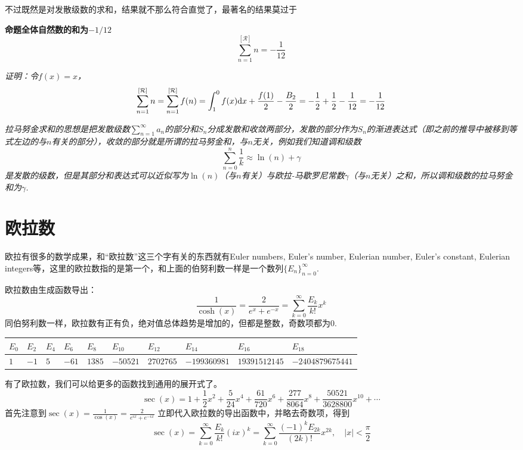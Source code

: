 \documentclass[UTF8]{ctexart}
\newcommand{\trm}[1]{{\rm #1}}
\newenvironment{proposition}[1]
    {\begin{tcolorbox}[enhanced, colback=LightYellow, breakable=true, frame hidden, borderline west={1.5mm}{-2mm}{Purple}]
    {\bfseries {\color{Purple} 命题}\quad #1} \newline}
    {\end{tcolorbox}}
\begin{document}
不过既然是对发散级数的求和，结果就不那么符合直觉了，最著名的结果莫过于
\begin{proposition}{全体自然数的和为\(-1/12\)}
    \[\sum_{n=1}^{[\mathcal{R}]}n=-\frac{1}{12}\]
\end{proposition}
\textit{证明：令\(f(x)=x\)，}
\[\sum_{n=1}^{[\mathcal{R}]}n = \sum_{n=1}^{[\mathcal{R}]}f(n) = \int_{1}^{0}f(x)\trm{d}x+\frac{f(1)}{2}-\frac{B_2}{2} = -\frac{1}{2}+\frac{1}{2}-\frac{1}{12} = -\frac{1}{12}\]

\textit{
    拉马努金求和的思想是把发散级数\(\displaystyle{\sum_{n=1}^{\infty}a_n}\)的部分和\(S_n\)分成发散和收敛两部分，发散的部分作为\(S_n\)的渐进表达式（即之前的推导中被移到等式左边的与\(n\)有关的部分），收敛的部分就是所谓的拉马努金和，与\(n\)无关，例如我们知道调和级数
    \[\sum_{n=0}^{n}\frac{1}{k} \approx \ln(n)+\gamma\]
    是发散的级数，但是其部分和表达式可以近似写为\(\ln(n)\)（与\(n\)有关）与欧拉-马歇罗尼常数\(\gamma\)（与\(n\)无关）之和，所以调和级数的拉马努金和为\(\gamma\).
}
\section{欧拉数}

欧拉有很多的数学成果，和“欧拉数”这三个字有关的东西就有Euler numbers, Euler's number, Eulerian number, Euler's constant, Eulerian integers等，这里的欧拉数指的是第一个，和上面的伯努利数一样是一个数列\(\{E_n\}_{n=0}^{\infty}\).

欧拉数由生成函数导出：
\[ \frac{1}{\cosh(x)} = \frac{2}{e^{x}+e^{-x}} = \sum_{k=0}^{\infty}\frac{E_k}{k!}x^k\]
同伯努利数一样，欧拉数有正有负，绝对值总体趋势是增加的，但都是整数，奇数项都为0.\\
\begin{tabular}{|l|l|l|l|l|l|l|l|l|l|}
    \hline
    \(E_{0}\) & \(E_{2}\) & \(E_{4}\) & \(E_{6}\) & \(E_{8}\) & \(E_{10}\) & \(E_{12}\) & \(E_{14}\) & \(E_{16}\) & \(E_{18}\) \\
    \hline
    \(1\) & \(-1\) & \(5\) & \(-61\) & \(1385\) & \(-50521\) & \(2702765\) & \(-199360981\) & \(19391512145\) & \(−2404879675441\) \\
    \hline
\end{tabular}

有了欧拉数，我们可以给更多的函数找到通用的展开式了。
\[ \sec(x) = 1+\frac{1}{2}x^2+\frac{5}{24}x^4+\frac{61}{720}x^6+\frac{277}{8064}x^8+\frac{50521}{3628800}x^{10}+\cdots\]
首先注意到\(\displaystyle{\sec(x) = \frac{1}{\cos(x)} = \frac{2}{e^{ix}+e^{-ix}}}\)
立即代入欧拉数的导出函数中，并略去奇数项，得到
\[ \sec(x) = \sum_{k=0}^{\infty} \frac{E_k}{k!}(ix)^k = \sum_{k=0}^{\infty}\frac{(-1)^kE_{2k}}{(2k)!}x^{2k}, \quad |x|<\frac{\pi}{2}\]
\end{document}
